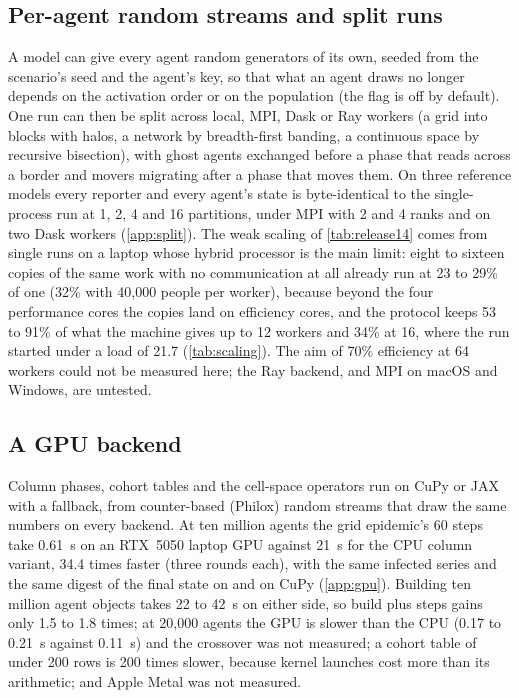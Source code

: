 \subsection{Per-agent random streams and split runs}
\label{sec:split}

A model can give every agent random generators of its own, seeded from the scenario's seed
and the agent's key, so that what an agent draws no longer depends on the activation order or
on the population (the flag is off by default). One run can then be split across local, MPI,
Dask or Ray workers (a grid into blocks with halos, a network by breadth-first banding, a
continuous space by recursive bisection), with ghost agents exchanged before a phase that
reads across a border and movers migrating after a phase that moves them. On three reference
models every reporter and every agent's state is byte-identical to the single-process run at
1, 2, 4 and 16 partitions, under MPI with 2 and 4 ranks and on two Dask workers
(\cref{app:split}). The weak scaling of \cref{tab:release14} comes from single runs on a laptop
whose hybrid processor is the main limit: eight to sixteen copies of the same work with no
communication at all already run at 23 to 29\% of one (32\% with 40,000 people per worker),
because beyond the four performance cores the copies land on efficiency cores, and the
protocol keeps 53 to 91\% of what the machine gives up to 12 workers and 34\% at 16, where the
run started under a load of 21.7 (\cref{tab:scaling}). The aim of 70\% efficiency at 64
workers could not be measured here; the Ray backend, and MPI on macOS and Windows, are
untested.

\subsection{A GPU backend}
\label{sec:gpu}

Column phases, cohort tables and the cell-space operators run on CuPy or JAX with a
 fallback, from counter-based (Philox) random streams that draw the same numbers
on every backend. At ten million agents the grid epidemic's 60 steps take 0.61~s on an
RTX~5050 laptop GPU against 21~s for the CPU column variant, 34.4 times faster (three rounds
each), with the same infected series and the same digest of the final state on 
and on CuPy (\cref{app:gpu}). Building ten million agent objects takes 22 to 42~s on either
side, so build plus steps gains only 1.5 to 1.8 times; at 20,000 agents the GPU is slower
than the CPU (0.17 to 0.21~s against 0.11~s) and the crossover was not measured; a cohort
table of under 200 rows is 200 times slower, because kernel launches cost more than its
arithmetic; and Apple Metal was not measured.


